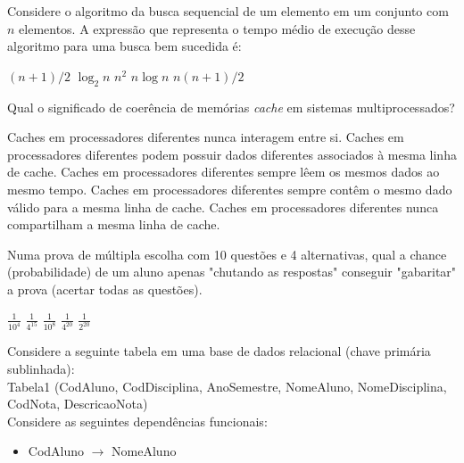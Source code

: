 \documentclass[12pt, addpoints]{exam}
\begin{document}
\begin{questions}
\question

Considere o algoritmo da busca sequencial de um elemento em um conjunto com \( n \) elementos. A expressão que representa o tempo médio de execução desse algoritmo para uma busca bem sucedida é:
\begin{choices}
\choice \( (n + 1)/2 \)
\choice \( \log_2 n \)
\choice \( n^2 \)
\choice \( n \log n \)
\choice \( n(n + 1)/2 \)
\end{choices}

\question

Qual o significado de coerência de memórias \textit{cache} em sistemas multiprocessados?


\begin{choices}
\choice Caches em processadores diferentes nunca interagem entre si.
\choice Caches em processadores diferentes podem possuir dados diferentes associados à mesma linha de cache.
\choice Caches em processadores diferentes sempre lêem os mesmos dados ao mesmo tempo.
\choice Caches em processadores diferentes sempre contêm o mesmo dado válido para a mesma linha de cache.
\choice Caches em processadores diferentes nunca compartilham a mesma linha de cache.
\end{choices}

\question

Numa prova de múltipla escolha com 10 questões e 4 alternativas, qual a chance (probabilidade) de um aluno apenas "chutando as respostas" conseguir "gabaritar" a prova (acertar todas as questões).


\begin{choices}
\choice \( \frac{1}{10^{4}} \)
\choice \( \frac{1}{4^{15}} \)
\choice \( \frac{1}{10^{8}} \)
\choice \( \frac{1}{4^{20}} \)
\choice \( \frac{1}{2^{20}} \)
\end{choices}

\question

Considere a seguinte tabela em uma base de dados relacional (chave primária sublinhada):\\

Tabela1 (CodAluno, CodDisciplina, AnoSemestre, NomeAluno, NomeDisciplina, CodNota, DescricaoNota)\\

Considere as seguintes dependências funcionais:

\begin{itemize}

    \item CodAluno \(\rightarrow\) NomeAluno


\end{itemize}
\end{questions}
\end{document}
